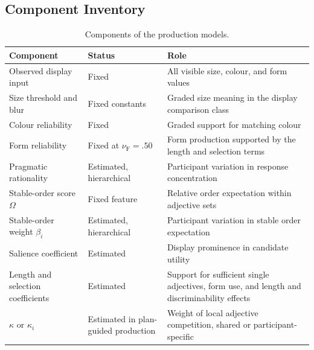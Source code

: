 \documentclass[10pt,a4paper,fleqn]{article}
\begin{document}
\subsection{Component Inventory}

\begin{table}[H]
\centering
\caption{Components of the production models.}
\label{tab:final-component-inventory}
\footnotesize
\begin{tabularx}{\textwidth}{>{\raggedright\arraybackslash}p{3.0cm}>{\raggedright\arraybackslash}p{3.0cm}X}
\toprule
Component & Status & Role \\
\midrule
Observed display input & Fixed & All visible size, colour, and form values \\
Size threshold and blur & Fixed constants & Graded size meaning in the display comparison class \\
Colour reliability & Fixed & Graded support for matching colour \\
Form reliability & Fixed at $\nu_{\mathrm F}=.50$ & Form production supported by the length and selection terms \\
Pragmatic rationality & Estimated, hierarchical & Participant variation in response concentration \\
Stable-order score $\Omega$ & Fixed feature & Relative order expectation within adjective sets \\
Stable-order weight $\beta_i$ & Estimated, hierarchical & Participant variation in stable order expectation \\
Salience coefficient & Estimated & Display prominence in candidate utility \\
Length and selection coefficients & Estimated & Support for sufficient single adjectives, form use, and length and discriminability effects \\
$\kappa$ or $\kappa_i$ & Estimated in plan-guided production & Weight of local adjective competition, shared or participant-specific \\
\bottomrule
\end{tabularx}
\end{table}
\end{document}
